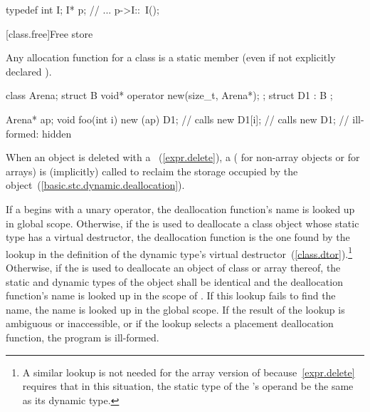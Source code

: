 \begin{codeblock}
typedef int I;
I* p;
// ...
p->I::~I();
\end{codeblock}
\exitnoteb

[class.free]{Free store}%
%

\pnum
{}
Any allocation function for a class
is a static member (even if not explicitly declared
).

\pnum
\enterexample

\begin{codeblock}
class Arena;
struct B {
    void* operator new(size_t, Arena*);
};
struct D1 : B {
};

Arena*  ap;
void foo(int i)
{
    new (ap) D1;		// calls 
    new D1[i];			// calls 
    new D1;			// ill-formed:  hidden
}
\end{codeblock}
\exitexampleb

\pnum
{}%
When an object is deleted with a
~(\ref{expr.delete}),
a 
%
(
%
for non-array objects or
%
for arrays) is (implicitly) called to reclaim the storage occupied by
the object~(\ref{basic.stc.dynamic.deallocation}).

\pnum
If a
begins with a unary
\tcode{::}
operator,
the deallocation function's name is looked up in global scope.
Otherwise, if the
is used to deallocate a class object whose static type has a virtual
destructor, the deallocation function is the one found by the lookup in
the definition of the dynamic type's virtual
destructor~(\ref{class.dtor}).\footnote{A similar lookup is not needed for
the array version of   because~\ref{expr.delete}
requires that in this situation, the static type of the
's operand be the same as its dynamic type.
}
Otherwise, if the
is used to deallocate an object of class
or array thereof, the static and dynamic types of the object shall be
identical and the deallocation function's name is looked up in the scope of
.
If this lookup fails to find the name, the name is looked up in the global
scope.
If the result of the lookup is ambiguous or inaccessible, or if the lookup
selects a placement deallocation function, the program is ill-formed.

